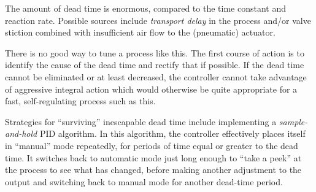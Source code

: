 





The amount of dead time is enormous, compared to the time constant and reaction rate.  Possible sources include {\it transport delay} in the process and/or valve stiction combined with insufficient air flow to the (pneumatic) actuator.







There is no good way to tune a process like this.  The first course of action is to identify the cause of the dead time and rectify that if possible.  If the dead time cannot be eliminated or at least decreased, the controller cannot take advantage of aggressive integral action which would otherwise be quite appropriate for a fast, self-regulating process such as this.

Strategies for ``surviving'' inescapable dead time include implementing a {\it sample-and-hold} PID algorithm.  In this algorithm, the controller effectively places itself in ``manual'' mode repeatedly, for periods of time equal or greater to the dead time.  It switches back to automatic mode just long enough to ``take a peek'' at the process to see what has changed, before making another adjustment to the output and switching back to manual mode for another dead-time period.




